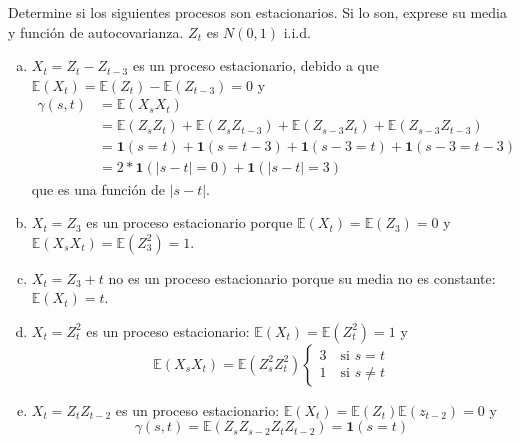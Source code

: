 

\addpoints
\question[10] Determine si los siguientes procesos son estacionarios. Si lo son, exprese su media y función de autocovarianza. $Z_t$ es $N(0,1)$ i.i.d.
\noaddpoints
{}
\begin{solution}
\begin{enumerate}[a)]
\item $X_{t}=Z_{t}-Z_{t-3}$ es un proceso estacionario, debido a que $\mathbb{E}(X_t)=\mathbb{E}(Z_t)-\mathbb{E}(Z_{t-3})=0$ y 
\begin{align*}
\gamma(s,t)&=\mathbb{E}(X_s X_t)\\
&=\mathbb{E}(Z_s Z_t)+\mathbb{E}(Z_s Z_{t-3})+\mathbb{E}(Z_{s-3}Z_{t})+\mathbb{E}(Z_{s-3}Z_{t-3})\\
&= \mathbf{1}(s=t)+\mathbf{1}(s=t-3)+\mathbf{1}(s-3=t)+\mathbf{1}(s-3=t-3)\\
&=2*\mathbf{1}(|s-t|=0)+\mathbf{1}(|s-t|=3)
\end{align*}
que es una función de $|s-t|$.
\item $X_t=Z_3$ es un proceso estacionario porque $\mathbb{E}(X_t)=\mathbb{E}(Z_3)=0$ y $\mathbb{E}(X_s X_t)=\mathbb{E}(Z_{3}^{2})=1$.
\item $X_t=Z_3+t$ no es un proceso estacionario porque su media no es constante: $\mathbb{E}(X_t)=t$.
\item $X_t=Z_{t}^{2}$ es un proceso estacionario: $\mathbb{E}(X_t)=\mathbb{E}(Z_{t}^{2})=1$ y
$$\mathbb{E}(X_sX_t)=\mathbb{E}(Z_{s}^{2}Z_{t}^{2})\begin{cases}
3\quad \text{si }s=t \\ 1 \quad \text{si } s\neq t\end{cases}$$
\item $X_t=Z_t Z_{t-2}$ es un proceso estacionario: $\mathbb{E}(X_t)=\mathbb{E}(Z_t)\mathbb{E}(z_{t-2})=0$ y $$\gamma(s,t)=\mathbb{E}(Z_{s}Z_{s-2}Z_{t}Z_{t-2})=\mathbf{1}(s=t)$$
\end{enumerate}
\end{solution}